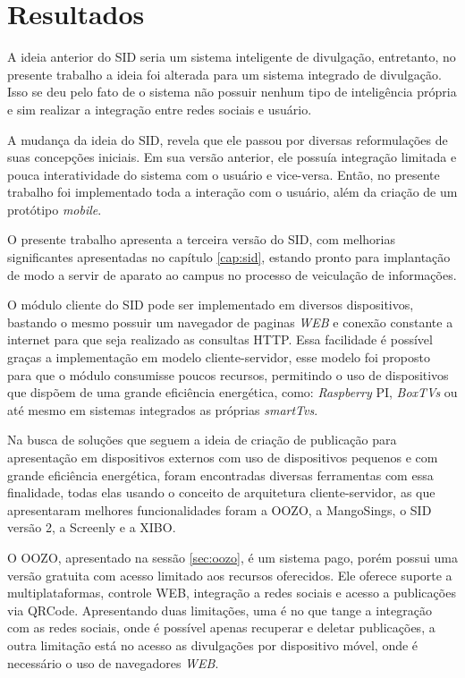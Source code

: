 \chapter[Resultados]{Resultados}
A ideia anterior do SID seria um sistema inteligente de divulgação, entretanto, no presente trabalho a ideia foi alterada para um sistema integrado de divulgação. Isso se deu pelo fato de o sistema não possuir nenhum tipo de inteligência própria e sim realizar a integração entre redes sociais e usuário.

A mudança da ideia do SID, revela que ele passou por diversas reformulações de suas concepções iniciais. Em sua versão anterior, ele possuía integração limitada e pouca interatividade do sistema com o usuário e vice-versa. Então, no presente trabalho foi implementado toda a interação com o usuário, além da criação de um protótipo \textit{mobile}.

O presente trabalho apresenta a terceira versão do SID, com melhorias significantes apresentadas no capítulo \ref{cap:sid}, estando pronto para implantação de modo a servir de aparato ao campus no processo de veiculação de informações.



O módulo cliente do SID pode ser implementado em diversos dispositivos, bastando o mesmo possuir um navegador de paginas \textit{WEB} e conexão constante a internet para que seja realizado as consultas HTTP. Essa facilidade é possível graças a implementação em modelo cliente-servidor, esse modelo foi proposto para que o módulo consumisse poucos recursos, permitindo o uso de dispositivos que dispõem de uma grande eficiência energética, como: \textit{Raspberry} PI, \textit{BoxTVs} ou até mesmo em sistemas integrados as próprias \textit{smartTvs}.


Na busca de soluções que seguem a ideia de criação de publicação para apresentação em dispositivos externos com uso de dispositivos pequenos e com grande eficiência energética, foram encontradas diversas ferramentas com essa finalidade, todas elas usando o conceito de arquitetura cliente-servidor, as que apresentaram melhores funcionalidades foram a OOZO, a MangoSings, o SID versão 2, a Screenly e a XIBO.

O OOZO, apresentado na sessão \ref{sec:oozo}, é um sistema pago, porém possui uma versão gratuita com acesso limitado aos recursos oferecidos. Ele oferece suporte a multiplataformas, controle WEB, integração a redes sociais e acesso a publicações via QRCode. Apresentando duas limitações, uma é no que tange a integração com as redes sociais, onde é possível apenas recuperar e deletar publicações, a outra limitação está no acesso as divulgações por dispositivo móvel, onde é necessário o uso de navegadores \textit{WEB}. 

